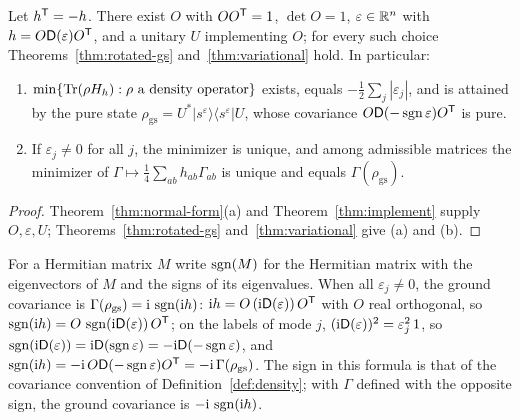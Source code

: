 \begin{theorem}\label{thm:ground-state}
Let $h^{\mathsf T}=-h$. There exist $O$ with $OO^{\mathsf T}=1$, $\det O=1$, $\varepsilon\in\mathbb R^n$ with
$h=O\mathsf D(\varepsilon)O^{\mathsf T}$, and a unitary $U$ implementing $O$; for every such choice
Theorems~\ref{thm:rotated-gs} and~\ref{thm:variational} hold. In particular:
\begin{enumerate}
\item[(a)] $\min\{\operatorname{Tr}(\rho H_h):\rho\text{ a density operator}\}$ exists, equals
$-\tfrac12\sum_j|\varepsilon_j|$, and is attained by the pure state
$\rho_{\mathrm{gs}}=U^*|s^\varepsilon\rangle\langle s^\varepsilon|U$, whose covariance
$O\mathsf D(-\operatorname{sgn}\varepsilon)O^{\mathsf T}$ is pure.
\item[(b)] If $\varepsilon_j\neq0$ for all $j$, the minimizer is unique, and among admissible
matrices the minimizer of $\Gamma\mapsto\tfrac14\sum_{ab}h_{ab}\Gamma_{ab}$ is unique and
equals $\Gamma(\rho_{\mathrm{gs}})$.
\end{enumerate}
\end{theorem}
\begin{proof}
Theorem~\ref{thm:normal-form}(a) and Theorem~\ref{thm:implement} supply $O,\varepsilon,U$;
Theorems~\ref{thm:rotated-gs} and~\ref{thm:variational} give (a) and (b).
\end{proof}
For a Hermitian matrix $M$ write $\operatorname{sgn}(M)$ for the Hermitian matrix with the eigenvectors of
$M$ and the signs of its eigenvalues. When all $\varepsilon_j\neq0$, the ground covariance is
$\Gamma(\rho_{\mathrm{gs}})=\mathrm i\,\operatorname{sgn}(\mathrm i h)$: $\mathrm i h=O\,(\mathrm i\mathsf D(\varepsilon))\,O^{\mathsf T}$ with $O$ real
orthogonal, so $\operatorname{sgn}(\mathrm i h)=O\,\operatorname{sgn}(\mathrm i\mathsf D(\varepsilon))\,O^{\mathsf T}$; on the labels of mode $j$,
$(\mathrm i\mathsf D(\varepsilon))^2=\varepsilon_j^2\,1$, so $\operatorname{sgn}(\mathrm i\mathsf D(\varepsilon))=\mathrm i\mathsf D(\operatorname{sgn}\varepsilon)
=-\mathrm i\mathsf D(-\operatorname{sgn}\varepsilon)$, and $\operatorname{sgn}(\mathrm i h)=-\mathrm i\,O\mathsf D(-\operatorname{sgn}\varepsilon)O^{\mathsf T}=-\mathrm i\,\Gamma(\rho_{\mathrm{gs}})$.
The sign in this formula is that of the covariance convention of Definition~\ref{def:density};
with $\Gamma$ defined with the opposite sign, the ground covariance is $-\mathrm i\,\operatorname{sgn}(\mathrm i h)$.

